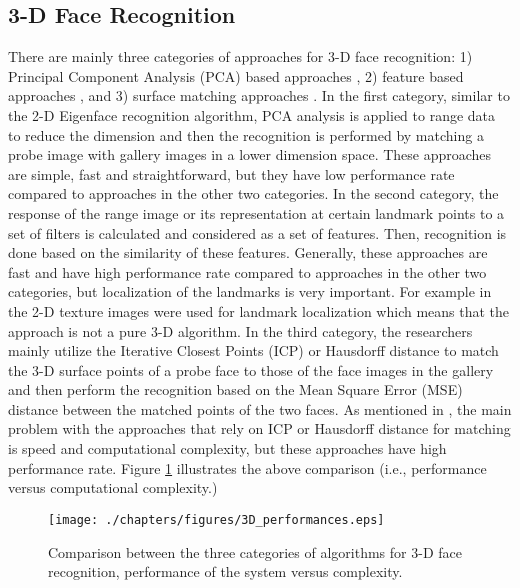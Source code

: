 \subsection{3-D Face Recognition} There are mainly three categories
of approaches for 3-D face recognition: 1) Principal Component
Analysis (PCA) based approaches \cite{FRGC2005,pan05}, 2) feature
based approaches \cite{Passalis05, cooks_06, Husken_05}, and 3)
surface matching approaches \cite{russ05, chang05, Maurer05}. In the
first category, similar to the 2-D Eigenface recognition algorithm,
PCA analysis is applied to range data to reduce the dimension and
then the recognition is performed by matching a probe image with
gallery images in a lower dimension space. These approaches are
simple, fast and straightforward, but they have low performance rate
compared to approaches in the other two categories. In the second
category, the response of the range image or its representation at
certain landmark points to a set of filters is calculated and
considered as a set of features. Then, recognition is done based on
the similarity of these features. Generally, these approaches are
fast and have high performance rate compared to approaches in the
other two categories, but localization of the landmarks is very
important. For example in \cite{Husken_05} the 2-D texture images
were used for landmark localization which means that the approach is
not a pure 3-D algorithm. In the third category, the researchers
mainly utilize the Iterative Closest Points (ICP) or Hausdorff
distance to match the 3-D surface points of a probe face to those of
the face images in the gallery and then perform the recognition
based on the Mean Square Error (MSE) distance between the matched
points of the two faces. As mentioned in \cite{3DFaceSurvey2006},
the main problem with the approaches that rely on ICP or Hausdorff
distance for matching is speed and computational complexity, but
these approaches have high performance rate. Figure
\ref{fig_3-D_comparison} illustrates the above comparison (i.e.,
performance versus computational complexity.)

\begin{figure}
\begin{center}
\texttt{[image: ./chapters/figures/3D\_performances.eps]}\\
\caption{Comparison between the three categories of algorithms for
3-D face recognition, performance of the system versus
complexity.}\label{fig_3-D_comparison}
\end{center}
\end{figure}

